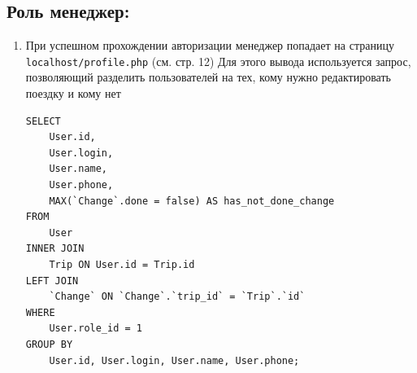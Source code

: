 \documentclass[a4paper,12pt]{article}
\begin{document}
\subsection{Роль менеджер:}
\begin{enumerate}
    \item При успешном прохождении авторизации менеджер попадает на страницу \texttt{localhost/profile.php} (см. стр. 12)
          Для этого вывода используется запрос, позволяющий разделить пользователей на тех, кому нужно редактировать поездку и кому нет \\

          \begin{lstlisting}[label={lst:sql-example}]
SELECT 
    User.id, 
    User.login, 
    User.name, 
    User.phone, 
    MAX(`Change`.done = false) AS has_not_done_change
FROM 
    User 
INNER JOIN 
    Trip ON User.id = Trip.id 
LEFT JOIN 
    `Change` ON `Change`.`trip_id` = `Trip`.`id` 
WHERE 
    User.role_id = 1
GROUP BY 
    User.id, User.login, User.name, User.phone;
    \end{lstlisting}


\end{enumerate}
\end{document}
